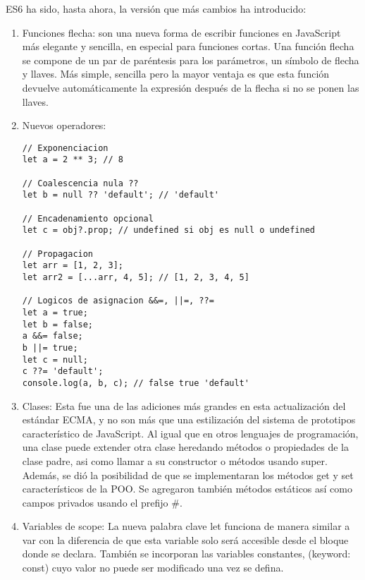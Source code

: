 \documentclass{article}
\begin{document}
ES6 ha sido, hasta ahora, la versión que más cambios ha introducido:

\begin{enumerate}
      \item Funciones flecha: son una nueva forma
      de escribir funciones en JavaScript más elegante y sencilla, 
      en especial para funciones cortas. Una función flecha se compone de un 
      par de paréntesis para los parámetros, un símbolo de
      flecha y llaves. Más simple, sencilla pero la mayor ventaja es que 
      esta función devuelve automáticamente la
      expresión después de la flecha si no se ponen las llaves.

      \item Nuevos operadores:
\begin{lstlisting}
// Exponenciacion
let a = 2 ** 3; // 8

// Coalescencia nula ??
let b = null ?? 'default'; // 'default'

// Encadenamiento opcional
let c = obj?.prop; // undefined si obj es null o undefined

// Propagacion
let arr = [1, 2, 3];
let arr2 = [...arr, 4, 5]; // [1, 2, 3, 4, 5]

// Logicos de asignacion &&=, ||=, ??=
let a = true;
let b = false;
a &&= false;
b ||= true;
let c = null;
c ??= 'default';
console.log(a, b, c); // false true 'default'
\end{lstlisting}

      \item Clases: Esta fue una de las adiciones más grandes en esta 
      actualización del estándar ECMA, y no son más que una estilización 
      del sistema de prototipos característico de JavaScript. Al igual que 
      en otros lenguajes de programación, una clase puede extender otra 
      clase heredando métodos o propiedades de la clase padre, asi como 
      llamar a su constructor o métodos usando super. Además, se 
      dió la posibilidad de que se implementaran los métodos get y set 
      característicos de la POO. Se agregaron también métodos estáticos así
      como campos privados usando el prefijo \#.

      \item Variables de scope:  La nueva palabra clave let funciona de 
      manera similar a var con la diferencia de que esta variable solo será 
      accesible desde el bloque donde se declara. También se incorporan las 
      variables constantes, (keyword: const) cuyo valor no puede ser 
      modificado una vez se defina.


\end{enumerate}
\end{document}
